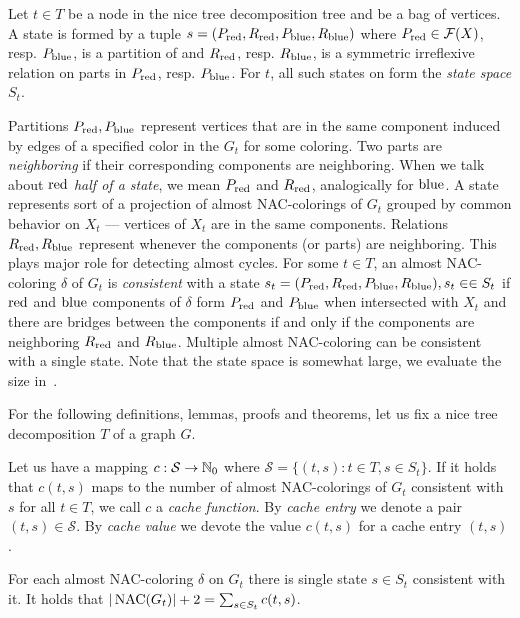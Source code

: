 %
\begin{definition}
	Let \( t \in T \) be a node in the nice tree decomposition tree and
	\Xt{} be a bag of vertices.
	A state is formed by a tuple \( s = (P_{\text{red}}, R_{\text{red}}, P_{\text{blue}}, R_{\text{blue}}) \)
	where \( P_{\text{red}} \in \mathcal{F}(X)\), resp. \( P_{\text{blue}} \), is a partition of \Xt{}
	and \( R_{\text{red}}\), resp. \(R_{\text{blue}} \), is a symmetric irreflexive relation
	on parts in \( P_{\text{red}}\), resp. \(P_{\text{blue}} \).
	For \( t \), all such states on \Xt{} form the \emph{state space} \( S_t \).
\end{definition}
%
Partitions \( P_{\text{red}}, P_{\text{blue}} \) represent vertices
that are in the same component induced by edges of a specified color
in the \( G_t \) for some coloring.
Two parts are \emph{neighboring} if their corresponding components are neighboring.
When we talk about \emph{\( \text{red} \) half of a state},
we mean \( P_{\text{red}} \) and \( R_{\text{red}} \),
analogically for \( \text{blue} \).
%
A state represents sort of a projection of almost NAC-colorings of \( G_t \)
grouped by common behavior on \( X_t \) --- vertices of \( X_t \) are in the same components.
%
Relations \( R_{\text{red}}, R_{\text{blue}} \) represent
whenever the components (or parts) are neighboring.
This plays major role for detecting almost cycles.
%
For some \( t \in T \),
an almost NAC-coloring \( \delta \) of \( G_t \)
is \emph{consistent} with a state \( s_t = (P_{\text{red}}, R_{\text{red}}, P_{\text{blue}}, R_{\text{blue}}), s_t \in \in S_t \)
if \( \text{red} \) and \( \text{blue} \) components of \( \delta \) form \( P_{\text{red}} \) and \( P_{\text{blue}} \)
when intersected with \( X_t \) and
there are bridges between the components if and only if
the components are neighboring \( R_{\text{red}} \) and \( R_{\text{blue}} \).
Multiple almost NAC-coloring can be consistent with a single state.
%
Note that the state space is somewhat large, we evaluate the size in~.

For the following definitions, lemmas, proofs and theorems, let us fix
a nice tree decomposition \( T \) of a graph \( G \).
%
\begin{definition}
	Let us have a mapping \( c: \mathcal{S} \to \mathbb{N}_0 \)
	where \( \mathcal{S} = \{ (t,s): t \in T, s \in S_t \} \).
	If it holds that \( c(t, s) \) maps to the number of almost NAC-colorings of \( G_t \)
	consistent with \( s \) for all \( t \in T \),
	we call \( c \) a \emph{cache function}.
	By \emph{cache entry} we denote a pair \( (t, s) \in \mathcal{S} \).
	By \emph{cache value} we devote the value \( c(t, s) \) for a cache entry \( (t, s) \).
\end{definition}
%
\begin{observation}
	For each almost NAC-coloring \( \delta \) on \( G_t \)
	there is single state \( s \in S_t \) consistent with it.
	It holds that \( |\operatorname{NAC}(G_t)| + 2 = \sum_{s \in S_t} c(t, s) \).
\end{observation}

